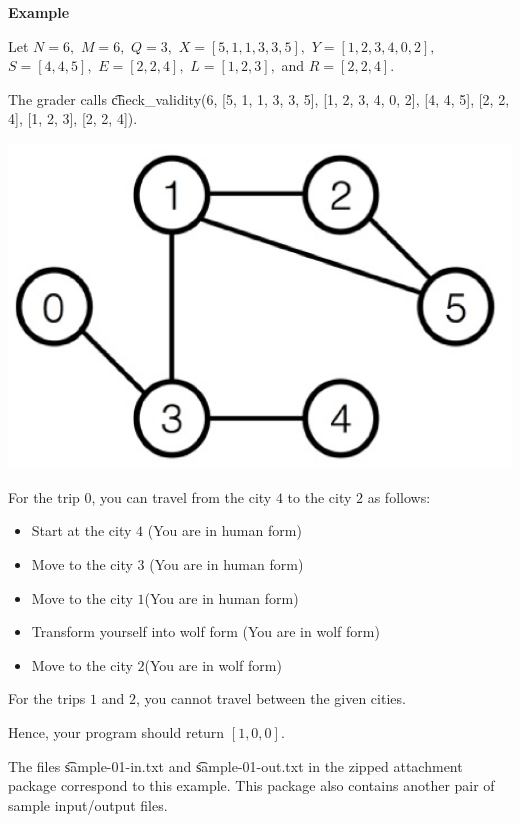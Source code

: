 \bf{Example}

Let $N=6,$ $M=6,$ $Q=3,$ $X=[5,1,1,3,3,5],$ $Y=[1,2,3,4,0,2],$ $S=[4,4,5],$ $E=[2,2,4],$ $L=[1,2,3],$ and $R=[2,2,4].$

The grader calls \t{check_validity(6, [5, 1, 1, 3, 3, 5], [1, 2, 3, 4, 0, 2], [4, 4, 5], [2, 2, 4], [1, 2, 3], [2, 2, 4]).}

\includegraphics{image.png}

For the trip $0$, you can travel from the city $4$ to the city $2$ as follows:

\begin{itemize}
\item Start at the city $4$ (You are in human form) 
\item Move to the city $3$ (You are in human form)
\item Move to the city $1$(You are in human form) 
\item Transform yourself into wolf form (You are in wolf form) 
\item Move to the city $2$(You are in wolf form)
\end{itemize}

For the trips $1$ and $2$, you cannot travel between the given cities.

Hence, your program should return $[1,0,0].$

The files \t{sample-01-in.txt }and \t{sample-01-out.txt }in the zipped attachment package correspond to this example. This package also contains another pair of sample input/output files.
